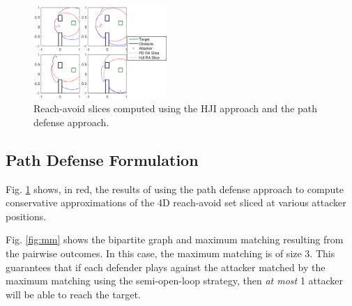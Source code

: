 
\begin{figure}
	\centering
	\includegraphics[width=0.45\textwidth]{"fig/OLGame_compare"}
	\caption{Reach-avoid slices computed using the HJI approach and the path defense approach. }
	\label{fig:comp_ol}
\end{figure}

\subsection{Path Defense Formulation}

Fig. \ref{fig:comp_ol} shows, in red, the results of using the path defense approach to compute conservative approximations of the 4D reach-avoid set sliced at various attacker positions.


Fig. \ref{fig:mm} shows the bipartite graph and maximum matching resulting from the pairwise outcomes. In this case, the maximum matching is of size 3. This guarantees that if each defender plays against the attacker matched by the maximum matching using the semi-open-loop strategy, then \textit{at most} 1 attacker will be able to reach the target.


